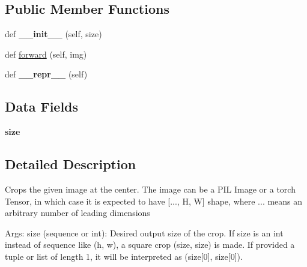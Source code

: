 \subsection*{Public Member Functions}
\begin{DoxyCompactItemize}
\item 
\mbox{\label{classtorchvision_1_1transforms_1_1transforms_1_1CenterCrop_abdce15890f9dddef06252e2a9f9c6ed8}} 
def {\bfseries \+\_\+\+\_\+init\+\_\+\+\_\+} (self, size)
\item 
def \hyperlink{classtorchvision_1_1transforms_1_1transforms_1_1CenterCrop_a58fccd376624bfd3852a9da8db7c84e6}{forward} (self, img)
\item 
\mbox{\label{classtorchvision_1_1transforms_1_1transforms_1_1CenterCrop_aff322bb5e55c472cbee019254b0c30d4}} 
def {\bfseries \+\_\+\+\_\+repr\+\_\+\+\_\+} (self)
\end{DoxyCompactItemize}
\subsection*{Data Fields}
\begin{DoxyCompactItemize}
\item 
\mbox{\label{classtorchvision_1_1transforms_1_1transforms_1_1CenterCrop_a80869e18c8b95ce7855701f9a4d8e86f}} 
{\bfseries size}
\end{DoxyCompactItemize}


\subsection{Detailed Description}
\begin{DoxyVerb}Crops the given image at the center.
The image can be a PIL Image or a torch Tensor, in which case it is expected
to have [..., H, W] shape, where ... means an arbitrary number of leading dimensions

Args:
    size (sequence or int): Desired output size of the crop. If size is an
        int instead of sequence like (h, w), a square crop (size, size) is
        made. If provided a tuple or list of length 1, it will be interpreted as (size[0], size[0]).
\end{DoxyVerb}
 

